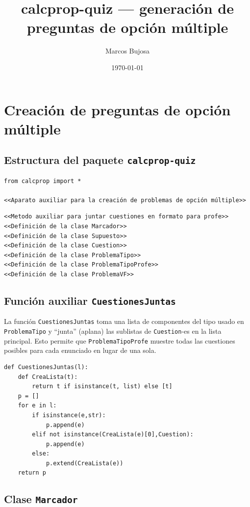 \documentclass[10pt,a4paper]{report}
\author{Marcos Bujosa}
\date{\today}
\title{calcprop-quiz — generación de preguntas de opción múltiple}
\begin{document}
\tableofcontents

\part{Creación de preguntas de opción múltiple}
\label{sec:orgc87fe8c}

\chapter{Estructura del paquete \texttt{calcprop-quiz}}
\label{sec:orge8e5bca}

\begin{verbatim}
from calcprop import *

<<Aparato auxiliar para la creación de problemas de opción múltiple>>
\end{verbatim}

\begin{verbatim}
<<Metodo auxiliar para juntar cuestiones en formato para profe>>
<<Definición de la clase Marcador>>
<<Definición de la clase Supuesto>>
<<Definición de la clase Cuestion>>
<<Definición de la clase ProblemaTipo>>
<<Definición de la clase ProblemaTipoProfe>>
<<Definición de la clase ProblemaVF>>
\end{verbatim}
\chapter{Función auxiliar \texttt{CuestionesJuntas}}
\label{sec:org7e0f8ca}

La función \texttt{CuestionesJuntas} toma una lista de componentes del tipo usado en \texttt{ProblemaTipo} y ``junta'' (aplana) las sublistas de \texttt{Cuestion}-es en la lista principal.
Esto permite que \texttt{ProblemaTipoProfe} muestre todas las cuestiones posibles para cada enunciado en lugar de una sola.
\begin{verbatim}
def CuestionesJuntas(l):
    def CreaLista(t):
        return t if isinstance(t, list) else [t]
    p = []
    for e in l:
        if isinstance(e,str):
            p.append(e)
        elif not isinstance(CreaLista(e)[0],Cuestion):
            p.append(e)
        else:
            p.extend(CreaLista(e))
    return p
\end{verbatim}
\chapter{Clase \texttt{Marcador}}
\label{sec:orgf76979c}
\end{document}
